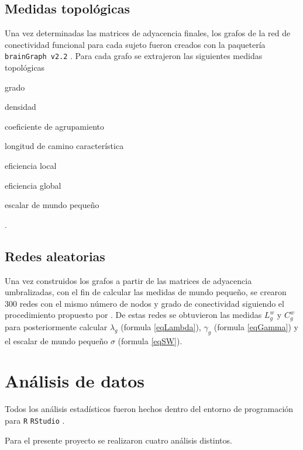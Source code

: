 \subsection{Medidas topológicas}
Una vez determinadas las matrices de adyacencia finales, los grafos de la red de conectividad funcional para cada sujeto fueron creados con la paquetería \texttt{brainGraph v2.2} \parencite{Watson2018}. Para cada grafo se extrajeron las siguientes medidas topológicas
\begin{enumerate*}[label=\emph{\alph*}), before=\unskip{: }, itemjoin={{; }}, itemjoin*={{, y }}]
    \item grado
    \item densidad
    \item coeficiente de agrupamiento
    \item longitud de camino característica
    \item eficiencia local
    \item eficiencia global
    \item escalar de mundo pequeño
\end{enumerate*}.

\subsection{Redes aleatorias}
Una vez construidos los grafos a partir de las matrices de adyacencia umbralizadas, con el fin de calcular las medidas de mundo pequeño, se crearon 300 redes con el mismo número de nodos y grado de conectividad siguiendo el procedimiento propuesto por \textcite{Maslov2002}. De estas redes se obtuvieron las medidas $L^w_g$ y $C^w_g$ para posteriormente calcular $\lambda_g$ (formula \ref{eqLambda}), $\gamma_g$ (formula \ref{eqGamma}) y el escalar de mundo pequeño $\sigma$ (formula \ref{eqSW}).

\section{Análisis de datos}
Todos los análisis estadísticos fueron hechos dentro del entorno de programación para \texttt{R} \texttt{RStudio} \parencite{Rstudio2018}.

Para el presente proyecto se realizaron cuatro análisis distintos.

